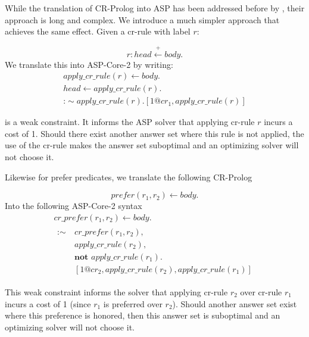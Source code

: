 While the translation of CR-Prolog into ASP has been addressed before by \citet{lee_translating_2018,yang_translating_2018}, their approach is long and complex.
We introduce a much simpler approach that achieves the same effect.
Given a cr-rule with label $r$:

\begin{equation}
    r: head \stackrel{+}\leftarrow body.
\end{equation}
We translate this into ASP-Core-2 by writing:
\begin{gather}
    apply\_cr\_rule(r) \leftarrow body. \\
    head \leftarrow apply\_cr\_rule(r). \\
    \text{:}\sim apply\_cr\_rule(r). [1@cr_1, apply\_cr\_rule(r)]
        \label{eq:apia_cr_prolog_prefer_weak_constraint}
\end{gather}

 is a weak constraint.
It informs the ASP solver that applying cr-rule $r$ incurs a cost of 1.
Should there exist another answer set where this rule is not applied, the use of the cr-rule makes the answer set suboptimal and an optimizing solver will not choose it.

Likewise for prefer predicates, we translate the following CR-Prolog

\begin{equation}
    prefer(r_1, r_2) \leftarrow body.
\end{equation}
Into the following ASP-Core-2 syntax
\begin{gather}
    cr\_prefer(r_1, r_2) \leftarrow body. \\
    \begin{split}
        \text{:}\sim \
            & cr\_prefer(r_1, r_2), \\
            & apply\_cr\_rule(r_2), \\
            & \textbf{not } apply\_cr\_rule(r_1). \\
            & [1@cr_2, apply\_cr\_rule(r_2), apply\_cr\_rule(r_1)]
    \end{split}
\end{gather}

This weak constraint informs the solver that applying cr-rule $r_2$ over cr-rule $r_1$ incurs a cost of 1 (since $r_1$ is preferred over $r_2$).
Should another answer set exist where this preference is honored, then this answer set is suboptimal and an optimizing solver will not choose it.

